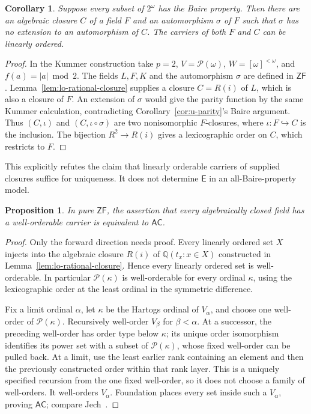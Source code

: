 \documentclass[11pt,a4paper]{article}
\newtheorem{proposition}[theorem]{Proposition}
\newtheorem{corollary}[theorem]{Corollary}
\theoremstyle{definition}\newtheorem{definition}[theorem]{Definition}
\theoremstyle{remark}\newtheorem{remark}[theorem]{Remark}
\newcommand{\ZF}{\mathsf{ZF}}\newcommand{\ZFA}{\mathsf{ZFA}}
\newcommand{\AC}{\mathsf{AC}}\newcommand{\BPI}{\mathsf{BPI}}
\newcommand{\E}{\mathsf E}\newcommand{\U}{\mathsf U}
\newcommand{\Q}{\mathbb Q}\newcommand{\F}{\mathbb F}
\begin{document}
\begin{corollary}\label{cor:bp-twisted-closure}
Suppose every subset of $2^\omega$ has the Baire property.  Then there
are an algebraic closure $C$ of a field $F$ and an automorphism $\sigma$
of $F$ such that $\sigma$ has no extension to an automorphism of $C$.
The carriers of both $F$ and $C$ can be linearly ordered.
\end{corollary}
\begin{proof}
In the Kummer construction take $p=2$,
$V=\mathcal P(\omega)$, $W=[\omega]^{<\omega}$, and
$f(a)=|a|\bmod2$.  The fields $L,F,K$ and the automorphism $\sigma$
are defined in $\ZF$.  Lemma~\ref{lem:lo-rational-closure} supplies a
closure $C=R(i)$ of $L$, which is also a closure of $F$.
An extension of $\sigma$ would give the parity function by the same
Kummer calculation, contradicting Corollary~\ref{cor:u-parity}'s Baire
argument.  Thus $(C,\iota)$ and $(C,\iota\circ\sigma)$ are two
nonisomorphic $F$-closures, where $\iota:F\hookrightarrow C$ is the
inclusion.  The bijection $R^2\to R(i)$ gives a lexicographic order on
$C$, which restricts to $F$.
\end{proof}

This explicitly refutes the claim that linearly orderable carriers of
supplied closures suffice for uniqueness.  It does not determine $\E$
in an all-Baire-property model.

\begin{proposition}\label{prop:all-acf-wo}
In pure $\ZF$, the assertion that every algebraically closed field has
a well-orderable carrier is equivalent to $\AC$.
\end{proposition}
\begin{proof}
Only the forward direction needs proof.  Every linearly ordered set $X$
injects into the algebraic closure $R(i)$ of $\Q(t_x:x\in X)$ constructed
in Lemma~\ref{lem:lo-rational-closure}.  Hence every linearly ordered set
is well-orderable.  In particular $\mathcal P(\kappa)$ is well-orderable
for every ordinal $\kappa$, using the lexicographic order at the least
ordinal in the symmetric difference.

Fix a limit ordinal $\alpha$, let $\kappa$ be the Hartogs ordinal of
$V_\alpha$, and choose one well-order of $\mathcal P(\kappa)$.
Recursively well-order $V_\beta$ for $\beta<\alpha$.
At a successor, the preceding well-order has order type below $\kappa$;
its unique order isomorphism identifies its power set with a subset of
$\mathcal P(\kappa)$, whose fixed well-order can be pulled back.
At a limit, use the least earlier rank containing an element and then
the previously constructed order within that rank layer.
This is a uniquely specified recursion from the one fixed well-order,
so it does not choose a family of well-orders.  It well-orders
$V_\alpha$.  Foundation places every set inside such a $V_\alpha$,
proving $\AC$; compare Jech~\cite[Theorem~9.1(b)]{Jech}.
\end{proof}
\end{document}
